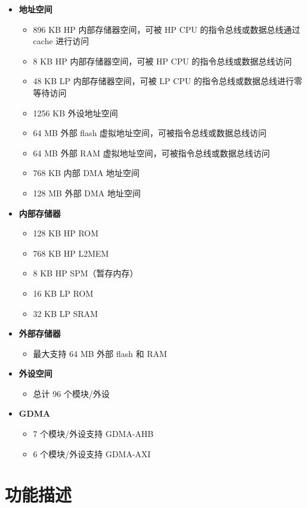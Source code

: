 \documentclass[main\_\_CN.tex]{subfiles}
\begin{document}
\begin{itemize}
    \item {\bfseries 地址空间}
    \begin{itemize}
	    \item 896 KB HP 内部存储器空间，可被 HP CPU 的指令总线或数据总线通过 cache 进行访问
        \item 8 KB HP 内部存储器空间，可被 HP CPU 的指令总线或数据总线访问
        \item 48 KB LP 内部存储器空间，可被 LP CPU 的指令总线或数据总线进行零等待访问
    	\item 1256 KB 外设地址空间
    	\item 64 MB 外部 flash 虚拟地址空间，可被指令总线或数据总线访问
        \item 64 MB 外部 RAM 虚拟地址空间，可被指令总线或数据总线访问
    	\item 768 KB 内部 DMA 地址空间
    	\item 128 MB 外部 DMA 地址空间
    \end{itemize}
    \item {\bfseries 内部存储器}
    \begin{itemize}
        \item 128 KB HP ROM
	    \item 768 KB HP L2MEM
        \item 8 KB HP SPM（暂存内存）
        \item 16 KB LP ROM
        \item 32 KB LP SRAM
	\end{itemize}
    \item {\bfseries 外部存储器}
    \begin{itemize}
        \item 最大支持 64 MB 外部 flash 和 RAM
	\end{itemize}
    \item \textbf{外设空间}
    \begin{itemize}
        \item 总计 96 个模块/外设
    \end{itemize}
    \item {\bfseries GDMA}
    \begin{itemize}
        \item 7 个模块/外设支持 GDMA-AHB
        \item 6 个模块/外设支持 GDMA-AXI
    \end{itemize}
\end{itemize}

\section{功能描述}
\end{document}
